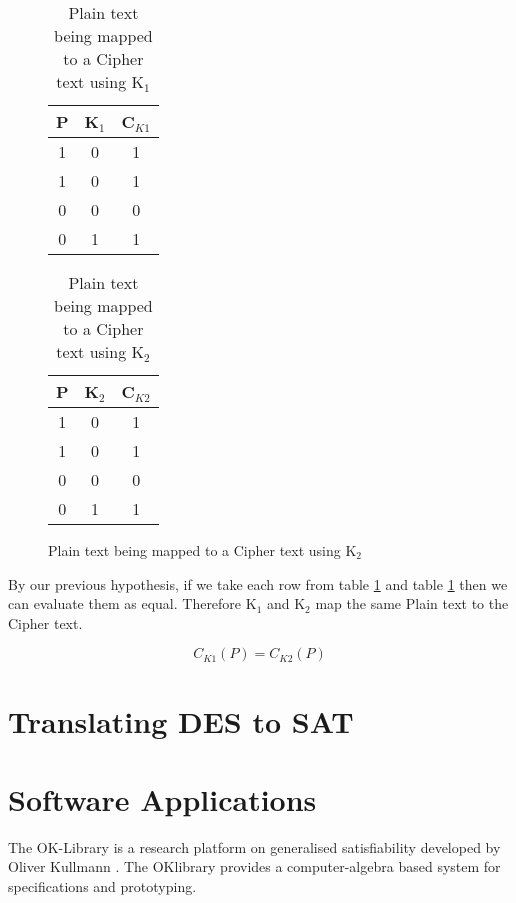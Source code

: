 \documentclass[11pt,a4paper]{report}
\begin{document}
\begin{figure}
\begin{table}[H]
\centering
\label{tab:C1}
\begin{tabular}{|c|c|c|}
\hline
P & K$_1$ & C$_{K1}$ \\ \hline
1 & 0 & 1 \\
1 & 0 & 1 \\
0 & 0 & 0 \\
0 & 1 & 1 \\
\hline
\end{tabular}
\caption{Plain text being mapped to a Cipher text using K$_1$}
\end{table}

\begin{table}[H]
\centering
\label{tab:C2}
\begin{tabular}{|c|c|c|}
\hline
P & K$_2$ & C$_{K2}$ \\ \hline
1 & 0 & 1 \\
1 & 0 & 1 \\
0 & 0 & 0 \\
0 & 1 & 1 \\
\hline
\end{tabular}
\caption{Plain text being mapped to a Cipher text using K$_2$}
\end{table}
\end{figure}

By our previous hypothesis, if we take each row from table \ref{tab:C1} and table \ref{tab:C2} then we can evaluate them as equal. Therefore K$_1$ and K$_2$ map the same Plain text to the Cipher text.

\begin{displaymath}
C_{K1}(P) = C_{K2}(P)
\end{displaymath}


\chapter{Translating DES to SAT}
\label{cha:AppDESSAT}






\chapter{Software Applications}
\label{cha:softApp}

The OK-Library is a research platform on generalised satisfiability developed by Oliver Kullmann \cite{Oliver2013OKlibrary}. The OKlibrary provides a computer-algebra based system for specifications and prototyping.
\end{document}
